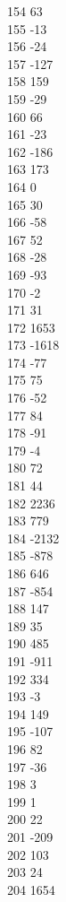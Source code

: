 { 154	63 \\
 155	-13 \\
 156	-24 \\
 157	-127 \\
 158	159 \\
 159	-29 \\
 160	66 \\
 161	-23 \\
 162	-186 \\
 163	173 \\
 164	0 \\
 165	30 \\
 166	-58 \\
 167	52 \\
 168	-28 \\
 169	-93 \\
 170	-2 \\
 171	31 \\
 172	1653 \\
 173	-1618 \\
 174	-77 \\
 175	75 \\
 176	-52 \\
 177	84 \\
 178	-91 \\
 179	-4 \\
 180	72 \\
 181	44 \\
 182	2236 \\
 183	779 \\
 184	-2132 \\
 185	-878 \\
 186	646 \\
 187	-854 \\
 188	147 \\
 189	35 \\
 190	485 \\
 191	-911 \\
 192	334 \\
 193	-3 \\
 194	149 \\
 195	-107 \\
 196	82 \\
 197	-36 \\
 198	3 \\
 199	1 \\
 200	22 \\
 201	-209 \\
 202	103 \\
 203	24 \\
 204	1654 \\
}
